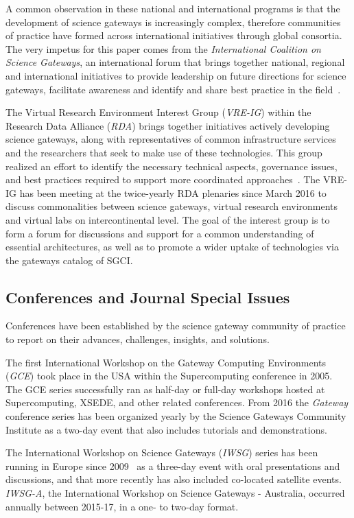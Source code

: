\documentclass[review]{elsarticle}
\begin{document}
A common observation in these national and international programs is that the development of science gateways is increasingly complex, therefore communities of practice have formed across international initiatives through global consortia. The very impetus for this paper comes from the \emph{International Coalition on Science Gateways}, an international forum that brings together national, regional and international initiatives to provide leadership on future directions for science gateways, facilitate awareness and identify and share best practice in the field~\cite{icsg-23}. 

The Virtual Research Environment Interest Group (\emph{VRE-IG}) within the Research Data Alliance (\emph{RDA}) brings together initiatives actively developing science gateways, along with representatives of common infrastructure services and the researchers that seek to make use of these technologies. This group realized an effort to identify the necessary technical aspects, governance issues, and best practices required to support more coordinated approaches~\cite{rda-vre-ig-24}. 
The VRE-IG has been meeting at the twice-yearly RDA plenaries since March 2016 to discuss commonalities between science gateways, virtual research environments and virtual labs on intercontinental level. The goal of the interest group is to form a forum for discussions and support for a common understanding of essential architectures, as well as to promote a wider uptake of technologies via the gateways catalog of SGCI.

\subsection{Conferences and Journal Special Issues}

Conferences have been established by the science gateway community of practice to report on their advances, challenges, insights, and solutions.

The first International Workshop on the Gateway Computing Environments (\emph{GCE}) took place in the USA within the Supercomputing conference in 2005. 
The GCE series successfully ran as half-day or full-day workshops hosted at Supercomputing, XSEDE, and other related conferences. 
From 2016 the \emph{Gateway} conference series has been organized yearly by the Science Gateways Community Institute as a two-day event that also includes tutorials and demonstrations.

The International Workshop on Science Gateways (\emph{IWSG}) series has been running in Europe since 2009~\cite{iwsg-25} as a three-day event with oral presentations and discussions, and that more recently has also included co-located  satellite events. 
\emph{IWSG-A}, the International Workshop on Science Gateways - Australia, occurred annually between 2015-17, in a one- to two-day format. 
\end{document}
